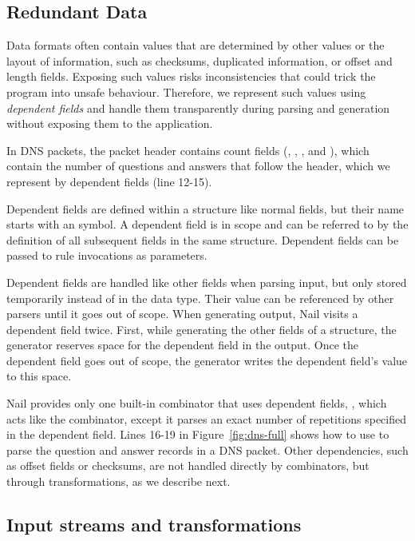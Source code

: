 \subsection{Redundant Data}
\label{s:dependent}
Data formats often contain values that are determined by other values or the layout of information,
such as checksums, duplicated information, or offset and  length fields. Exposing such values risks
inconsistencies that could trick the program into unsafe behaviour. Therefore, we represent such values using \emph{dependent fields} and handle them transparently during
parsing and generation without exposing them to the application.


In DNS packets, the packet header contains count fields (,
, , and ), which contain the number of questions and answers that follow the
header, which we represent by dependent fields (line 12-15).

Dependent fields are defined within a structure like normal fields, but their name starts with an  symbol.
A dependent field is in scope and can be referred to by the definition of all subsequent fields in
the same structure. Dependent fields can be passed to rule invocations as parameters.

Dependent fields are handled like other fields when parsing input, but only stored temporarily
instead of in the data type. Their value can be referenced by other parsers until it goes out of scope.
When generating output, Nail visits a dependent field twice. First, while generating the other fields of a
structure, the generator reserves space for the dependent field in the output. Once
the dependent field goes out of scope, the generator  writes the
dependent field's value to this space.

Nail provides only one built-in combinator that uses dependent fields, , which acts like
the  combinator, except it parses an exact number of repetitions specified in the dependent
field. Lines 16-19 in Figure~\ref{fig:dns-full} shows how to use  to parse the question and
answer records in a DNS packet.
Other dependencies, such as offset fields or checksums, are not handled directly by combinators, but
through  transformations, as we describe next.

\subsection{Input streams and transformations}
\label{s:transforms}

